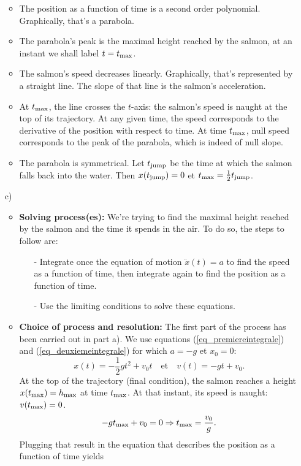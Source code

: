 \begin{enumerate}
\begin{itemize}
\item The position as a function of time is a second order polynomial. Graphically, that's a parabola.
\item The parabola's peak is the maximal height reached by the salmon, at an instant we shall label $t=t_{\rm max}$.
\item The salmon's speed decreases linearly. Graphically, that's represented by a straight line. The slope of that line is the salmon's acceleration.
\item At $t_{\rm max}$, the line crosses the $t$-axis: the salmon's speed is naught at the top of its trajectory. At any given time, the speed corresponds to the derivative of the position with respect to time. At time $t_{\rm max}$, null speed corresponds to the peak of the parabola, which is indeed of null slope.
\item The parabola is symmetrical. Let $t_{\rm jump}$ be the time at which the salmon falls back into the water. Then $x(t_{\rm jump}) = 0$ et $t_{\rm max}= \frac{1}{2}t_{\rm jump}$.  
\end{itemize}
\item[c) ] 
\begin{itemize}
\item \textbf{Solving process(es):} We're trying to find the maximal height reached by the salmon and the time it spends in the air. To do so, the steps to follow are:

\begin{itemize}
\item[-] Integrate once the equation of motion $\ddot{x}(t)=a$ to find the speed as a function of time, then integrate again to find the position as a function of time.
\item[-] Use the limiting conditions to solve these equations. \\
\end{itemize}
 \item \textbf{Choice of process and resolution:} 
The first part of the process has been carried out in part a). We use equations
 (\ref{eq_premiereintegrale}) and (\ref{eq_deuxiemeintegrale}) for which $a=-g$ et $x_0=0$:
\[
x(t) = -\frac{1}{2}gt^2 + v_0 t \quad \textrm{et} \quad v(t) = -gt + v_0. 
\]
At the top of the trajectory (final condition), the salmon reaches a height $x(t_{\rm max}) = h_{\rm max}$ at time $t_{\rm max}$. At that instant, its speed is naught: $v(t_{\rm max})=0$. 
\[
-gt_{\rm max} + v_0=0 \Rightarrow t_{\rm max} = \frac{v_0}{g}.
\]
Plugging that result in the equation that describes the position as a function of time yields


\end{itemize}
\end{enumerate}
